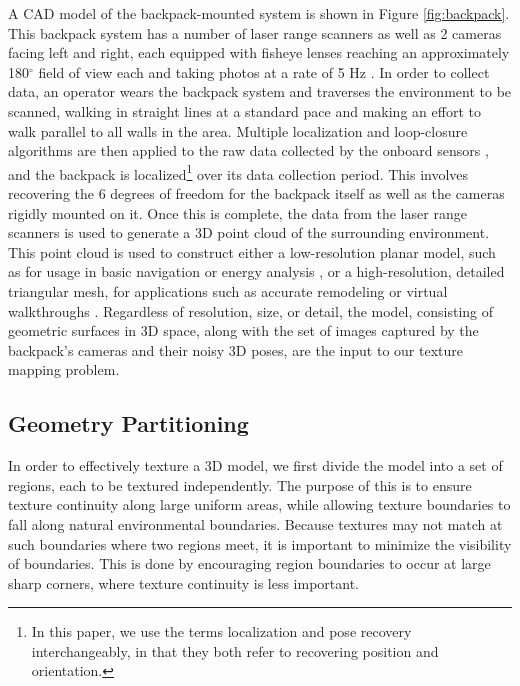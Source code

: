 \documentclass[]{spie}  %
\begin{document}
A CAD model of the backpack-mounted system is shown in Figure
\ref{fig:backpack}. This backpack system has a number of laser range
scanners as well as 2 cameras facing left and right, each equipped
with fisheye lenses reaching an approximately 180$^{\circ}$ field of
view each and taking photos at a rate of 5 Hz \cite{liu2010indoor}. In
order to collect data, an operator wears the
backpack system and traverses the environment to be scanned, walking
in straight lines at a standard pace and making an effort to walk
parallel to all walls in the area. Multiple localization and
loop-closure algorithms are then applied to the raw data collected by
the onboard sensors \cite{chen2010indoor, kua2012loopclosure,
  liu2010indoor}, and the backpack is localized\footnote{In this
  paper, we use the terms localization and pose recovery
  interchangeably, in that they both refer to recovering position and
  orientation.}  over its data collection period. This involves
recovering the 6 degrees of freedom for the backpack itself as well as
the cameras rigidly mounted on it. Once this is complete, the data
from the laser range scanners is used to generate a 3D point cloud of
the surrounding environment. This point cloud is used to construct
either a low-resolution planar model, such as for usage in basic
navigation or energy analysis \cite{sanchez2012point,
  turnerfloorplane}, or a high-resolution, detailed triangular mesh,
for applications such as accurate remodeling or virtual walkthroughs
\cite{turnerwatertight}.  Regardless of resolution, size, or detail,
the model, consisting of geometric surfaces in 3D space, along with
the set of images captured by the backpack's cameras and their noisy
3D poses, are the input to our texture mapping problem.

\subsection{Geometry Partitioning}
\label{sec:geometryPartioning}
In order to effectively texture a 3D model, we first divide the model
into a set of regions, each to be textured independently. The purpose
of this is to ensure texture continuity along large uniform areas,
while allowing texture boundaries to fall along natural environmental
boundaries. Because textures may not match at such boundaries where
two regions meet, it is important to minimize the visibility of
boundaries. This is done by encouraging region boundaries to occur at
large sharp corners, where texture continuity is less important.
\end{document}
